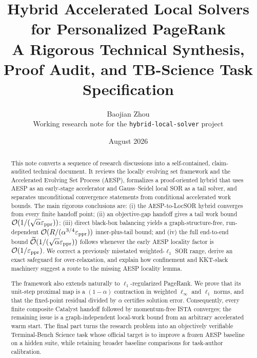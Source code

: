 \documentclass[11pt]{article}
\title{Hybrid Accelerated Local Solvers for Personalized PageRank\\
\large A Rigorous Technical Synthesis, Proof Audit, and TB-Science Task Specification}
\author{Baojian Zhou\\
\small Working research note for the \texttt{hybrid-local-solver} project}
\date{August 2026}
\begin{document}
\maketitle

\begin{abstract}
This note converts a sequence of research discussions into a self-contained,
claim-audited technical document.  It reviews the locally evolving set
framework and the Accelerated Evolving Set Process (AESP), formalizes a
proof-oriented hybrid that uses AESP as an early-stage accelerator and
Gauss--Seidel local SOR as a tail solver, and separates unconditional
convergence statements from conditional accelerated work bounds.  The main
rigorous conclusions are: (i) the AESP-to-LocSOR hybrid converges from every
finite handoff point; (ii) an objective-gap handoff gives a tail work bound
\(\mathcal O(1/(\sqrt{\alpha}\varepsilon_{\mathrm{ppr}}))\); (iii) direct black-box balancing yields
a graph-structure-free, run-dependent
\(\mathcal O(R/(\alpha^{3/4}\varepsilon_{\mathrm{ppr}}))\) inner-plus-tail bound; and (iv) the full
end-to-end bound \(\widetilde{\mathcal{O}}(1/(\sqrt{\alpha}\varepsilon_{\mathrm{ppr}}))\) follows whenever the early
AESP locality factor is \(\mathcal O(1/\varepsilon_{\mathrm{ppr}})\).  We correct a previously
misstated weighted-\(\ell_1\) SOR range, derive an exact safeguard for
over-relaxation, and explain how confinement and KKT-slack machinery suggest a
route to the missing AESP locality lemma.

The framework also extends naturally to \(\ell_1\)-regularized PageRank.  We
prove that its unit-step proximal map is a \((1-\alpha)\) contraction in
weighted \(\ell_\infty\) and \(\ell_1\) norms, and that the fixed-point
residual divided by \(\alpha\) certifies solution error.  Consequently, every
finite composite Catalyst handoff followed by momentum-free ISTA converges;
the remaining issue is a graph-independent local-work bound from an arbitrary
accelerated warm start.  The final part turns the research problem into an
objectively verifiable Terminal-Bench Science task whose official target is to
improve a frozen AESP baseline on a hidden suite, while retaining broader
baseline comparisons for task-author calibration.
\end{abstract}

\tableofcontents















\appendix






\end{document}
